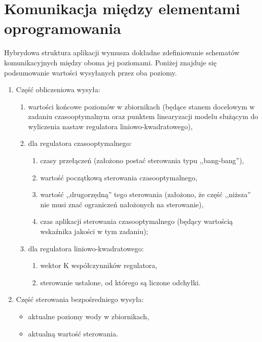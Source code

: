 \section{Komunikacja między elementami oprogramowania}
\label{sec:komunikacja}

Hybrydowa struktura aplikacji wymusza dokładne zdefiniowanie schematów komunikacyjnych między oboma jej poziomami.
Poniżej znajduje się podsumowanie wartości wysyłanych przez oba poziomy.

\begin{enumerate} 
    \item Część obliczeniowa wysyła:
    \begin{enumerate}
        \item wartości końcowe poziomów w zbiornikach (będące stanem docelowym w zadaniu czasooptymalnym oraz punktem linearyzacji modelu służącym do wyliczenia nastaw regulatora liniowo-kwadratowego),
        \item dla regulatora czasooptymalnego:
        \begin{enumerate}
            \item czasy przełączeń (założono postać sterowania typu ,,bang-bang''),
            \item wartość początkową sterowania czasooptymalnego,
            \item wartość ,,drugorzędną'' tego sterowania (założono, że część ,,niższa'' nie musi znać ograniczeń nałożonych na sterowanie),
            \item czas aplikacji sterowania czasooptymalnego (będący wartością wskaźnika jakości w tym zadaniu);
        \end{enumerate}
        \item dla regulatora liniowo-kwadratowego:
        \begin{enumerate}
            \item wektor K współczynników regulatora,
            \item sterowanie ustalone, od którego są liczone odchyłki.
        \end{enumerate}
    \end{enumerate}
    \item Część sterowania bezpośredniego wysyła:
    \begin{itemize}
        \item aktualne poziomy wody w zbiornikach,
        \item aktualną wartość sterowania.
    \end{itemize}
\end{enumerate}

